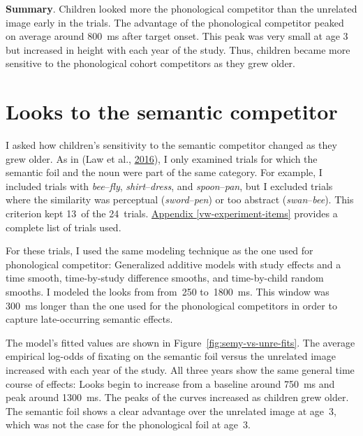 \documentclass [11pt, proquest] {uwthesis}[2015/03/03]
\begin{document}
\textbf{Summary}. Children looked more the phonological competitor than
the unrelated image early in the trials. The advantage of the
phonological competitor peaked on average around 800~ms after target
onset. This peak was very small at age 3 but increased in height with
each year of the study. Thus, children became more sensitive to the
phonological cohort competitors as they grew older.

\section{Looks to the semantic
competitor}\label{looks-to-the-semantic-competitor}

I asked how children's sensitivity to the semantic competitor changed as
they grew older. As in (Law et al.,
\protect\hyperlink{ref-RWLPaper}{2016}), I only examined trials for
which the semantic foil and the noun were part of the same category. For
example, I included trials with \emph{bee}--\emph{fly},
\emph{shirt}--\emph{dress}, and \emph{spoon}--\emph{pan}, but I excluded
trials where the similarity was perceptual (\emph{sword}--\emph{pen}) or
too abstract (\emph{swan}--\emph{bee}). This criterion kept 13~of the
24~trials. \protect\hyperlink{vw-experiment-items}{Appendix
\ref{vw-experiment-items}} provides a complete list of trials used.

For these trials, I used the same modeling technique as the one used for
phonological competitor: Generalized additive models with study effects
and a time smooth, time-by-study difference smooths, and time-by-child
random smooths. I modeled the looks from from~250 to~1800~ms. This
window was 300~ms longer than the one used for the phonological
competitors in order to capture late-occurring semantic effects.

The model's fitted values are shown in
Figure~\ref{fig:semy-vs-unre-fits}. The average empirical log-odds of
fixating on the semantic foil versus the unrelated image increased with
each year of the study. All three years show the same general time
course of effects: Looks begin to increase from a baseline around 750~ms
and peak around 1300~ms. The peaks of the curves increased as children
grew older. The semantic foil shows a clear advantage over the unrelated
image at age~3, which was not the case for the phonological foil at
age~3.
\end{document}
